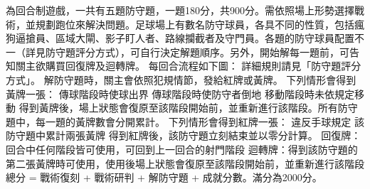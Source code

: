 \markdownRendererOlEndTight \markdownRendererParagraphSeparator
{}
\markdownRendererSectionEnd \markdownRendererSectionBegin
{}\markdownRendererInterblockSeparator
{}為回合制遊戲，一共有五題防守題，一題180分，共900分。需依照場上形勢選擇戰術，並規劃跑位來解決問題。足球場上有數名防守球員，各具不同的性質，包括瘋狗逼搶員、區域大閘、影子盯人者、路線攔截者及守門員。各題的防守球員配置不一（詳見防守題評分方式），可自行決定解題順序。另外，開始解每一題前，可告知關主欲購買回復牌及迴轉牌。\markdownRendererParagraphSeparator
{}每回合流程如下圖：\markdownRendererParagraphSeparator
{}\markdownRendererParagraphSeparator
{}詳細規則請見「防守題評分方式」。\markdownRendererInterblockSeparator
{}\markdownRendererSectionBegin
{}\markdownRendererInterblockSeparator
{}解防守題時，關主會依照犯規情節，發給紅牌或黃牌。\markdownRendererParagraphSeparator
{}下列情形會得到黃牌一張：\markdownRendererInterblockSeparator
{}\markdownRendererUlBeginTight
\markdownRendererUlItem 傳球階段時使球出界\markdownRendererUlItemEnd 
\markdownRendererUlItem 傳球階段時使防守者倒地\markdownRendererUlItemEnd 
\markdownRendererUlItem 移動階段時未依規定移動\markdownRendererUlItemEnd 
\markdownRendererUlEndTight \markdownRendererInterblockSeparator
{}得到黃牌後，場上狀態會復原至該階段開始前，並重新進行該階段。所有防守題中，每一題的黃牌數會分開累計。\markdownRendererParagraphSeparator
{}下列情形會得到紅牌一張：\markdownRendererInterblockSeparator
{}\markdownRendererUlBeginTight
\markdownRendererUlItem 違反手球規定\markdownRendererUlItemEnd 
\markdownRendererUlItem 該防守題中累計兩張黃牌\markdownRendererUlItemEnd 
\markdownRendererUlEndTight \markdownRendererInterblockSeparator
{}得到紅牌後，該防守題立刻結束並以零分計算。\markdownRendererInterblockSeparator
{}
\markdownRendererSectionEnd \markdownRendererSectionBegin
{}\markdownRendererInterblockSeparator
{}\markdownRendererUlBeginTight
\markdownRendererUlItem 回復牌：回合中任何階段皆可使用，可回到上一回合的射門階段\markdownRendererUlItemEnd 
\markdownRendererUlItem 迴轉牌：得到該防守題的第二張黃牌時可使用，使用後場上狀態會復原至該階段開始前，並重新進行該階段\markdownRendererUlItemEnd 
\markdownRendererUlEndTight \markdownRendererInterblockSeparator
{}
\markdownRendererSectionEnd 
\markdownRendererSectionEnd \markdownRendererSectionBegin
{}\markdownRendererInterblockSeparator
{}總分 = 戰術復刻 + 戰術研判 + 解防守題 + 成就分數。滿分為2000分。\markdownRendererInterblockSeparator
